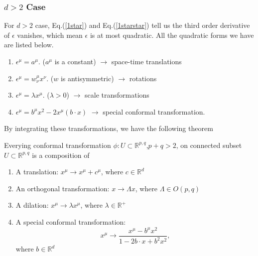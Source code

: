 \documentclass[a4paper,11pt]{article}
\begin{document}
\subsubsection{$d>2$ Case}
For $d>2$ case, Eq.(\ref{1star}) and Eq.(\ref{1starstar}) tell us the third order derivative of $\epsilon$ vanishes, which mean $\epsilon$ is at most quadratic. All the quadratic forms we have are listed below.
\begin{enumerate}
    \item $\epsilon^\mu=a^\mu$.   ($a^\mu$ is a constant) $\rightarrow$ space-time translations
    \item $\epsilon^\mu=w^\mu_\nu x^\nu$. ($w$ is antisymmetric)  $\rightarrow$ rotations
    \item $\epsilon^\mu=\lambda x^\mu$. ($\lambda>0$) $\rightarrow$ scale transformations
    \item $\epsilon^\mu=b^\mu x^2-2x^\mu(b\cdot x)$ $\rightarrow$ special conformal transformation.
\end{enumerate}
By integrating these transformations, we have the following theorem
\begin{framed}
Everying conformal transformation $\phi:U\subset\mathbb{R}^{p,q}$,$p+q>2$, on connected subset $U\subset\mathbb{R}^{p,q}$ is a composition of 
\begin{enumerate}
    \item A translation: $x^\mu\rightarrow x^\mu+c^\mu$, where $c\in\mathbb{R}^d$
    \item An orthogonal transformation: $x\rightarrow \Lambda x$, where $\Lambda\in O(p,q)$
    \item A dilation: $x^\mu\rightarrow \lambda x^\mu$, where $\lambda\in\mathbb{R}^+$
    \item A special conformal transformation:
    \begin{equation*}
        x^\mu\rightarrow\frac{x^\mu-b^\mu x^2}{1-2b\cdot x+b^2x^2},
    \end{equation*}
    where $b\in\mathbb{R}^d$
\end{enumerate}
\end{framed}
\end{document}
